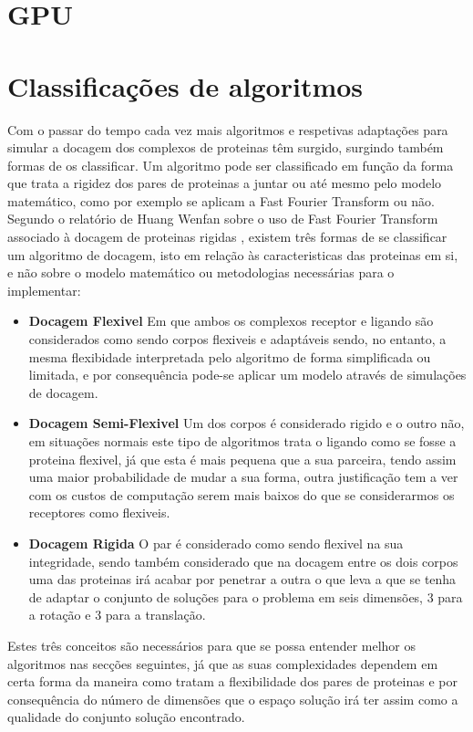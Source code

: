 \section{GPU}
\label{gpus}


\section{Classificações de algoritmos}
\label{classi}
Com o passar do tempo cada vez mais algoritmos e respetivas adaptações para simular a docagem dos complexos de proteinas têm surgido, surgindo também formas de os classificar. Um algoritmo pode ser classificado em função da forma que trata a rigidez dos pares de proteinas a juntar ou até mesmo pelo modelo matemático, como por exemplo se aplicam a Fast Fourier Transform ou não.
Segundo o relatório de Huang Wenfan sobre o uso de Fast Fourier Transform associado à docagem de proteinas rigidas \cite{fftrigid}, existem três formas de se classificar um algoritmo de docagem, isto em relação às caracteristicas das proteinas em si, e não sobre o modelo matemático ou metodologias necessárias para o implementar:
\begin{itemize}
\item \textbf{Docagem Flexivel} Em que ambos os complexos receptor e ligando são considerados como sendo corpos flexiveis e adaptáveis sendo, no entanto, a mesma flexibidade interpretada pelo algoritmo de forma simplificada ou limitada, e por consequência pode-se aplicar um modelo através de simulações de docagem.
\item \textbf{Docagem Semi-Flexivel} Um dos corpos é considerado rigido e o outro não, em situações normais este tipo de algoritmos trata o ligando como se fosse a proteina flexivel, já que esta é mais pequena que a sua parceira, tendo assim uma maior probabilidade de mudar a sua forma, outra justificação tem a ver com os custos de computação serem mais baixos do que se considerarmos os receptores como flexiveis.
\item \textbf{Docagem Rigida} O par é considerado como sendo flexivel na sua integridade, sendo também considerado que na docagem entre os dois corpos uma das proteinas irá acabar por penetrar a outra o que leva a que se tenha de adaptar o conjunto de soluções para o problema em seis dimensões, 3 para a rotação e 3 para a translação.
\end{itemize}
Estes três conceitos são necessários para que se possa entender melhor os algoritmos nas secções seguintes, já que as suas complexidades dependem em certa forma da maneira como tratam a flexibilidade dos pares de proteinas e por consequência do número de dimensões que o espaço solução irá ter assim como a qualidade do conjunto solução encontrado.

